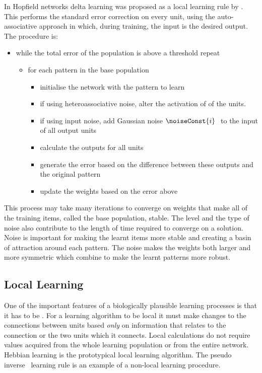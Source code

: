 In Hopfield networks delta learning was proposed as a local learning rule by \citet{Diederich1987}.  This performs the standard error correction on every unit, using the auto-associative approach in which, during training, the input is the desired output.  The procedure is:
\begin{itemize}[label=\textbullet, rightmargin=1.5cm]
	\item while the total error of the population is above a threshold repeat 
	\begin{itemize}[label=\textbullet]
		\item for each pattern in the base population
		\begin{itemize}[label=\textbullet]
			\item initialise the network with the pattern to learn
			\item if using heteroassociative noise, alter the activation of  of the units.  
			\item if using input noise, add Gaussian noise $\noiseConst{i}\ $ to the input of all output units  			
			\item calculate the outputs for all units
			\item generate the error based on the difference between these outputs and the original pattern
			\item update the weights based on the error above
		\end{itemize} 
	\end{itemize}
\end{itemize}
This process may take many iterations to converge on weights that make all of the training items, called the base population, stable.  The level and the type of noise also contribute to the length of time required to converge on a solution.  Noise is important for making the learnt items more stable and creating a basin of attraction around each pattern.  The noise makes the weights both larger and more symmetric which combine to make the learnt patterns more robust.



\subsection{Local Learning}

One of the important features of a biologically plausible learning processes is that it has to be .  For a learning algorithm to be local it must make changes to the connections between units based \emph{only} on information that relates to the connection or the two units which it connects. Local calculations do not require values acquired from the whole learning population or from the entire network.  Hebbian learning is the prototypical local learning algorithm.  The pseudo inverse~\citep{Hertz1991, Storkey1997} learning rule is an example of a non-local learning procedure.

